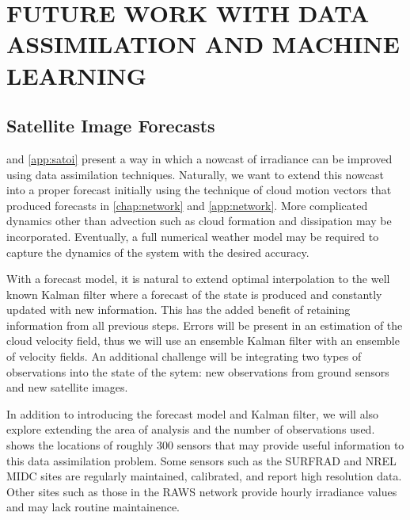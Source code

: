 \chapter{FUTURE WORK WITH DATA ASSIMILATION AND MACHINE LEARNING}
\label{chap:satfx}



\section{Satellite Image Forecasts}

 and \cref{app:satoi} present a way in which a
nowcast of irradiance can be improved using data assimilation
techniques.
Naturally, we want to extend this nowcast into a proper forecast
initially using the technique of cloud motion vectors that produced
forecasts in \cref{chap:network} and \cref{app:network}.
More complicated dynamics other than advection such as cloud formation
and dissipation may be incorporated.
Eventually, a full numerical weather model may be required to capture
the dynamics of the system with the desired accuracy.


With a forecast model, it is natural to extend optimal interpolation
to the well known Kalman filter where a forecast of the state is
produced and constantly updated with new information.
This has the added benefit of retaining information from all previous
steps.
Errors will be present in an estimation of the cloud velocity field,
thus we will use an ensemble Kalman filter with an ensemble of
velocity fields.
An additional challenge will be integrating two types of observations
into the state of the sytem: new observations from ground sensors and
new satellite images.


In addition to introducing the forecast model and Kalman filter, we
will also explore extending the area of analysis and the number of
observations used.
 shows the locations of roughly 300 sensors that
may provide useful information to this data assimilation problem.
Some sensors such as the SURFRAD and NREL MIDC sites are regularly
maintained, calibrated, and report high resolution data.
Other sites such as those in the RAWS network provide hourly
irradiance values and may lack routine maintainence.

